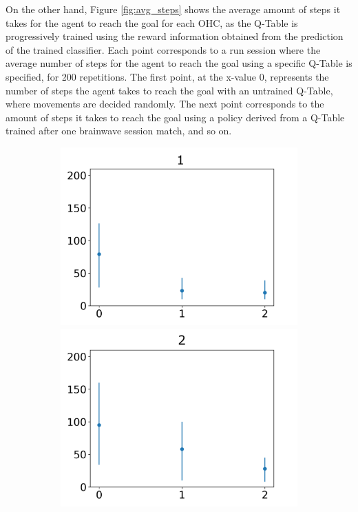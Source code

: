 \documentclass[journal]{IEEEtran}
\begin{document}
{{On the other hand, Figure \ref{fig:avg_steps} shows the average amount of steps it takes for the agent to reach the goal for each OHC, as the Q-Table is progressively trained using the reward information obtained from the prediction of the trained classifier. Each point corresponds to a run session where the average number of steps for the agent to reach the goal using a specific Q-Table is specified, for 200 repetitions. The first point, at the x-value 0, represents the number of steps the agent takes to reach the goal with an untrained Q-Table, where movements are decided randomly. The next point corresponds to the amount of steps it takes to reach the goal using a policy derived from a Q-Table trained after one brainwave session match, and so on.

\begin{figure}[h!]
\begin{subfigure}{0.5\textwidth}
\centering
\includegraphics[scale=0.27]{Images/Average_steps/a.png}
\includegraphics[scale=0.27]{Images/Average_steps/b.png}

\end{subfigure}
\end{figure}}}
\end{document}
